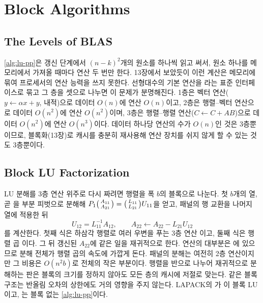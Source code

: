 \section{Block Algorithms}
\label{sec:blocked-lu}

\subsection{The Levels of BLAS}

\cref{alg:lu-pp}은 갱신 단계에서 $(n-k)^2$개의 원소를 하나씩 읽고 써서, 원소 하나를 메모리에서 가져올 때마다 연산 두 번만 한다. 13장에서 보았듯이 이런 계산은 메모리에 묶여 프로세서의 연산 능력을 쓰지 못한다. 선형대수의 기본 연산을 라는 표준 인터페이스로 묶고 그 층을 셋으로 나누면 이 문제가 분명해진다. 1층은 벡터 연산($y\gets\alpha x+y$, 내적)으로 데이터 $O(n)$에 연산 $O(n)$이고\cite{lawson1979blas1}, 2층은 행렬--벡터 연산으로 데이터 $O(n^2)$에 연산 $O(n^2)$이며, 3층은 행렬--행렬 연산($C\gets C+AB$)으로 데이터 $O(n^2)$에 연산 $O(n^3)$이다\cite{dongarra1990blas3}. 데이터 하나당 연산의 수가 $O(n)$인 것은 3층뿐이므로, 블록화(13장)로 캐시를 충분히 재사용해 연산 장치를 쉬지 않게 할 수 있는 것도 3층뿐이다.

\subsection{Block LU Factorization}

LU 분해를 3층 연산 위주로 다시 짜려면 행렬을 폭 $b$의 블록으로 나눈다. 첫 $b$개의 열, 곧 을 부분 피벗으로 분해해 $P_1\begin{psmallmatrix}A_{11}\\A_{21}\end{psmallmatrix}=\begin{psmallmatrix}L_{11}\\L_{21}\end{psmallmatrix}U_{11}$을 얻고, 패널의 행 교환을 나머지 열에 적용한 뒤
\[
U_{12}=L_{11}^{-1}A_{12},\qquad A_{22}\gets A_{22}-L_{21}U_{12}
\]
를 계산한다. 첫째 식은 하삼각 행렬로 여러 우변을 푸는 3층 연산 이고, 둘째 식은 행렬 곱 이다. 그 뒤 갱신된 $A_{22}$에 같은 일을 재귀적으로 한다. 연산의 대부분은 에 있으므로 분해 전체가 행렬 곱의 속도에 가깝게 돈다. 패널의 분해는 여전히 2층 연산이지만 그 비용은 $O(n^2b)$로 전체의 작은 부분이다. 행렬을 반으로 나누어 재귀적으로 분해하는 판은 블록의 크기를 정하지 않아도 모든 층의 캐시에 저절로 맞는다\cite{toledo1997recursive}. 같은 블록 구조는 반올림 오차의 상한에도 거의 영향을 주지 않는다\cite{higham2002accuracy}. LAPACK의 가 이 블록 LU이고\cite{anderson1999lapack}, 는 블록 없는 \cref{alg:lu-pp}이다.

